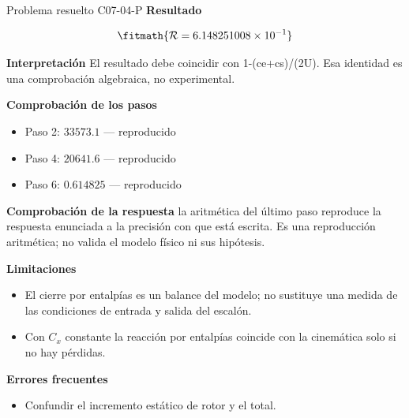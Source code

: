 \documentclass[10pt,openany]{book}
\begin{document}
\begin{studiumworked}{Problema resuelto C07-04-P}
\noindent\textbf{Resultado}

\[
\fitmath{\mathcal R=6.148251008\times10^{-1}}
\]

\noindent\textbf{Interpretación}
El resultado debe coincidir con 1-(ce+cs)/(2U). Esa identidad es una comprobación algebraica, no experimental.

\noindent\textbf{Comprobación de los pasos}
\begin{itemize}
\item Paso 2: $33573.1$ — reproducido
\item Paso 4: $20641.6$ — reproducido
\item Paso 6: $0.614825$ — reproducido
\end{itemize}

\noindent\textbf{Comprobación de la respuesta} la aritmética del último paso reproduce la respuesta enunciada a la precisión con que está escrita. Es una reproducción aritmética; no valida el modelo físico ni sus hipótesis.

\noindent\textbf{Limitaciones}
\begin{itemize}
\item El cierre por entalpías es un balance del modelo; no sustituye una medida de las condiciones de entrada y salida del escalón.
\item Con $C_x$ constante la reacción por entalpías coincide con la cinemática solo si no hay pérdidas.
\end{itemize}

\noindent\textbf{Errores frecuentes}
\begin{itemize}
\item Confundir el incremento estático de rotor y el total.
\end{itemize}
\end{studiumworked}
\end{document}
